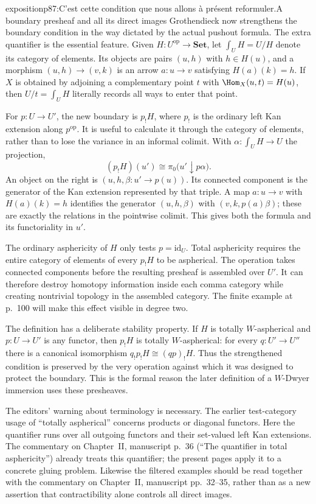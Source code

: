 \begin{dcomment}{exposition}{p87:C’est cette condition que nous allons à présent reformuler.}{A boundary presheaf and all its direct images}
Grothendieck now strengthens the boundary condition in the way dictated by the actual pushout formula. The extra quantifier is the essential feature. Given $H:U^{\mathrm{op}}\to\mathbf{Set}$, let $\int_U H=U/H$ denote its category of elements. Its objects are pairs $(u,h)$ with $h\in H(u)$, and a morphism $(u,h)\to(v,k)$ is an arrow $a:u\to v$ satisfying $H(a)(k)=h$. If $X$ is obtained by adjoining a complementary point $t$ with $\Hom_X(u,t)=H(u)$, then $U/t=\int_U H$ literally records all ways to enter that point.

For $p:U\to U'$, the new boundary is $p_!H$, where $p_!$ is the ordinary left Kan extension along $p^{\mathrm{op}}$. It is useful to calculate it through the category of elements, rather than to lose the variance in an informal colimit. With $\alpha:\int_UH\to U$ the projection,
\[
(p_!H)(u')\cong\pi_0\bigl(u'\downarrow p\alpha\bigr).
\]
An object on the right is $(u,h,\beta:u'\to p(u))$. Its connected component is the generator of the Kan extension represented by that triple. A map $a:u\to v$ with $H(a)(k)=h$ identifies the generator $(u,h,\beta)$ with $(v,k,p(a)\beta)$; these are exactly the relations in the pointwise colimit. This gives both the formula and its functoriality in $u'$.

The ordinary asphericity of $H$ only tests $p=\mathrm{id}_U$. Total asphericity requires the entire category of elements of every $p_!H$ to be aspherical. The operation takes connected components before the resulting presheaf is assembled over $U'$. It can therefore destroy homotopy information inside each comma category while creating nontrivial topology in the assembled category. The finite example at p.~100 will make this effect visible in degree two.

The definition has a deliberate stability property. If $H$ is totally $W$-aspherical and $p:U\to U'$ is any functor, then $p_!H$ is totally $W$-aspherical: for every $q:U'\to U''$ there is a canonical isomorphism $q_!p_!H\cong(qp)_!H$. Thus the strengthened condition is preserved by the very operation against which it was designed to protect the boundary. This is the formal reason the later definition of a $W$-Dwyer immersion uses these presheaves.

The editors' warning about terminology is necessary. The earlier test-category usage of ``totally aspherical'' concerns products or diagonal functors. Here the quantifier runs over all outgoing functors and their set-valued left Kan extensions. The commentary on Chapter~II, manuscript p.~36 (``The quantifier in total asphericity'') already treats this quantifier; the present pages apply it to a concrete gluing problem. Likewise the filtered examples should be read together with the commentary on Chapter~II, manuscript pp.~32--35, rather than as a new assertion that contractibility alone controls all direct images.
\end{dcomment}

